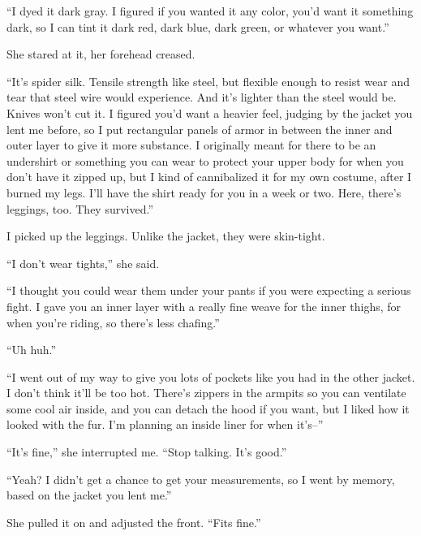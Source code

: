 ``I dyed it dark gray.  I figured if you wanted it any color, you'd want it something dark, so I can tint it dark red, dark blue, dark green, or whatever you want.''



She stared at it, her forehead creased.



``It's spider silk.  Tensile strength like steel, but flexible enough to resist wear and tear that steel wire would experience.  And it's lighter than the steel would be.  Knives won't cut it.  I figured you'd want a heavier feel, judging by the jacket you lent me before, so I put rectangular panels of armor in between the inner and outer layer to give it more substance.  I originally meant for there to be an undershirt or something you can wear to protect your upper body for when you don't have it zipped up, but I kind of cannibalized it for my own costume, after I burned my legs.  I'll have the shirt ready for you in a week or two.  Here, there's leggings, too.  They survived.''



I picked up the leggings.  Unlike the jacket, they were skin-tight.



``I don't wear tights,'' she said.



``I thought you could wear them under your pants if you were expecting a serious fight.  I gave you an inner layer with a really fine weave for the inner thighs, for when you're riding, so there's less chafing.''



``Uh huh.''



``I went out of my way to give you lots of pockets like you had in the other jacket.  I don't think it'll be too hot.  There's zippers in the armpits so you can ventilate some cool air inside, and you can detach the hood if you want, but I liked how it looked with the fur.  I'm planning an inside liner for when it's--''



``It's fine,'' she interrupted me.  ``Stop talking.  It's good.''



``Yeah?  I didn't get a chance to get your measurements, so I went by memory, based on the jacket you lent me.''



She pulled it on and adjusted the front.  ``Fits fine.''



